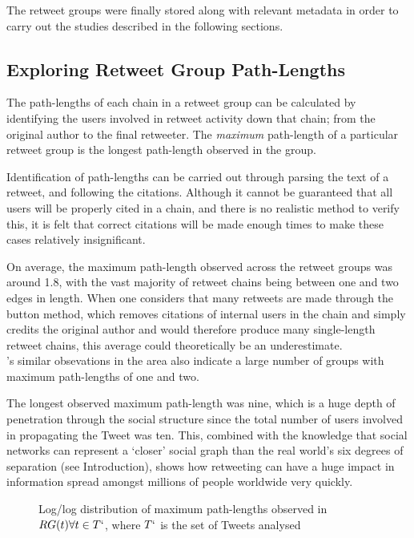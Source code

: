 The retweet groups were finally stored along with relevant metadata in order to carry out the studies described in the following sections.


\subsection{Exploring Retweet Group Path-Lengths}
The path-lengths of each chain in a retweet group can be calculated by identifying the users involved in retweet activity down that chain; from the original author to the final retweeter. The \textit{maximum} path-length of a particular retweet group is the longest path-length observed in the group.

Identification of path-lengths can be carried out through parsing the text of a retweet, and following the citations. Although it cannot be guaranteed that all users will be properly cited in a chain, and there is no realistic method to verify this, it is felt that correct citations will be made enough times to make these cases relatively insignificant.

On average, the maximum path-length observed across the retweet groups was around 1.8, with the vast majority of retweet chains being between one and two edges in length. When one considers that many retweets are made through the button method, which removes citations of internal users in the chain and simply credits the original author and would therefore produce many single-length retweet chains, this average could theoretically be an underestimate.\\
\cite{kwak10}'s similar obsevations in the area also indicate a large number of groups with maximum path-lengths of one and two.

The longest observed maximum path-length was nine, which is a huge depth of penetration through the social structure since the total number of users involved in propagating the Tweet was ten. This, combined with the knowledge that social networks can represent a `closer' social graph than the real world's six degrees of separation (see Introduction), shows how retweeting can have a huge impact in information spread amongst millions of people worldwide very quickly.

\begin{figure}[h]
\centering
    \caption{Log/log distribution of maximum path-lengths observed in $RG(t) \forall t \in T`$, where $T`$ is the set of Tweets analysed}
    \label{fig:pathlength-distribution}
\end{figure}


